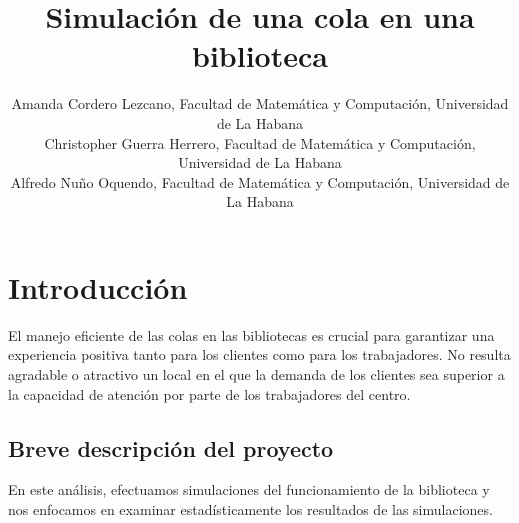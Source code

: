 \documentclass[10pt,twocolumn]{article}
\begin{document}
\title{Simulación de una cola en una biblioteca}
\author{
	Amanda Cordero Lezcano, Facultad de Matemática y Computación, Universidad de La Habana\\
	Christopher Guerra Herrero, Facultad de Matemática y Computación, Universidad de La Habana\\
	Alfredo Nuño Oquendo, Facultad de Matemática y Computación, Universidad de La Habana\\
}






\section{Introducción}
El manejo eficiente de las colas en las bibliotecas es crucial para garantizar una experiencia positiva tanto para los clientes como para los trabajadores. No resulta agradable o atractivo un local en el que la demanda de los clientes sea superior a la capacidad de atención por parte de los trabajadores del centro.

\subsection{Breve descripción del proyecto}
En este análisis, efectuamos simulaciones del funcionamiento de la biblioteca y nos enfocamos en examinar estadísticamente los resultados de las simulaciones.
\end{document}
